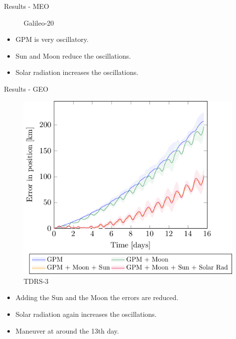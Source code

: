 \documentclass{beamer} %
\begin{document}
\begin{frame}{Results - MEO}
\begin{figure}[ht]
\begin{minipage}[ht]{0.45\textwidth}
      \caption{Galileo-20}
    \end{minipage}
  \end{figure}
  \begin{itemize}
    \item GPM is very oscillatory.
    \item Sun and Moon reduce the oscillations.
    \item Solar radiation increases the oscillations.
  \end{itemize}
\end{frame}
\begin{frame}{Results - GEO}
  \begin{minipage}{0.48\textwidth}
    \begin{figure}[ht]
      \centering
      \includegraphics[width=\textwidth]{../Images/simulation/TDRS-3.pdf}
      \caption{TDRS-3}
    \end{figure}
  \end{minipage}
  \hfill
  \begin{minipage}{0.48\textwidth}
    \begin{itemize}
      \item Adding the Sun and the Moon the errors are reduced.
      \item Solar radiation again increases the oscillations.
      \item Maneuver at around the 13th day.
    \end{itemize}
  \end{minipage}
\end{frame}
\end{document}

